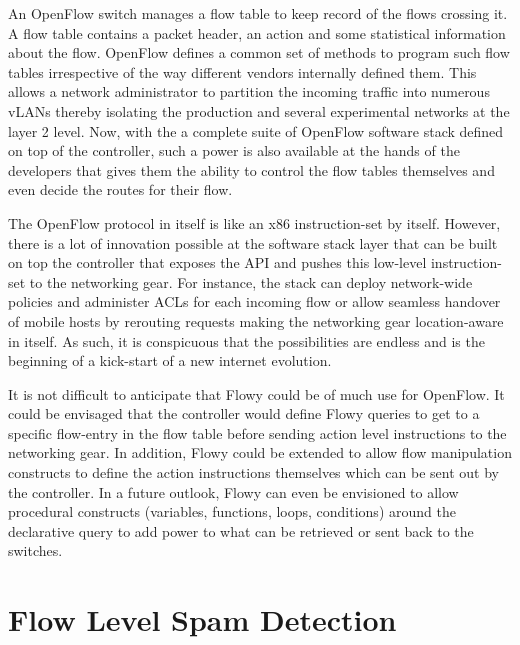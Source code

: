 An OpenFlow switch manages a flow table to keep record of the flows crossing it. A flow table contains a packet header, an action and some statistical information about the flow. OpenFlow defines a common set of methods to program such  flow tables irrespective of the way different vendors internally defined them. This allows a network administrator to partition the incoming traffic into numerous \ac{vLANs} thereby isolating the production and several experimental networks at the layer 2 level. Now, with the a complete suite of OpenFlow software stack defined on top of the controller, such a power is also available at the hands of the developers that gives them the ability to control the flow tables themselves and even decide the routes for their flow.

The OpenFlow protocol in itself is like an x$86$ instruction-set by itself. However, there is a lot of innovation possible at the software stack layer that can be built on top the controller that exposes the API and pushes this low-level instruction-set to the networking gear. For instance, the stack can deploy  network-wide policies and administer \ac{ACLs} for each incoming flow or  allow seamless handover of mobile hosts by rerouting requests making the networking gear location-aware in itself. As such, it is conspicuous that the possibilities are endless and is the beginning of a kick-start of a new internet evolution.

It is not difficult to anticipate that Flowy could be of much use for OpenFlow. It could be envisaged that the controller would define Flowy queries to get to a specific flow-entry in the flow table before sending action level instructions to the networking gear.  In addition, Flowy could be extended to allow flow manipulation constructs to define the action instructions themselves which can be sent out by the controller. In a future outlook, Flowy can even be envisioned to allow procedural constructs (variables, functions, loops, conditions) around the declarative query to add power to what can be retrieved or sent back to the switches. 

\section{Flow Level Spam Detection}\label{sec:spam-detection}

